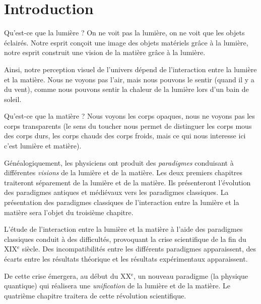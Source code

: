 \chapter{Introduction}

Qu'est-ce que la lumière ? On ne voit pas la lumière, on ne voit que les objets éclairés. Notre esprit conçoit une image des objets matériels grâce à la lumière, notre esprit construit une vision de la matière grâce à la lumière.

Ainsi, notre perception visuel de l'univers dépend de l'interaction entre la lumière et la matière. Nous ne voyons pas l'air, mais nous pouvons le sentir (quand il y a du vent), comme nous pouvons sentir la chaleur de la lumière lors d'un bain de soleil.

Qu'est-ce que la matière ? Nous voyons les corps opaques, nous ne voyons pas les corps transparents (le sens du toucher nous permet de distinguer les corps mous des corps durs, les corps chauds des corps froids, mais ce qui nous interesse ici c'est lumière et matière). 

Généalogiquement, les physiciens ont produit des {\it paradigmes} conduisant à différentes {\it visions} de la lumière et de la matière.
Les deux premiers chapitres traiteront séparement de la lumière et de la matière. Ils présenteront l'évolution des paradigmes antiques et médiévaux vers les paradigmes classiques.
La présentation des paradigmes classiques de l'interaction entre la lumière et la matière sera l'objet du troisième chapitre.

L'étude de l'interaction entre la lumière et la matière à l'aide des paradigmes classiques conduit à des difficultés, provoquant la crise scientifique de la fin du {\footnotesize XIX}$^\text{e}$ siècle. Des incompatibilités entre les différents paradigmes apparaissent, des écarts entre les résultats théorique et les résultats expérimentaux apparaissent.

De cette crise émergera, au début du {\footnotesize XX}$^\text{e}$, un nouveau paradigme (la physique quantique) qui réalisera une {\it unification} de la lumière et de la matière.
Le quatrième chapitre traitera de cette révolution scientifique.

\subsection{}\subsection{}
\begin{center}
\end{center}

